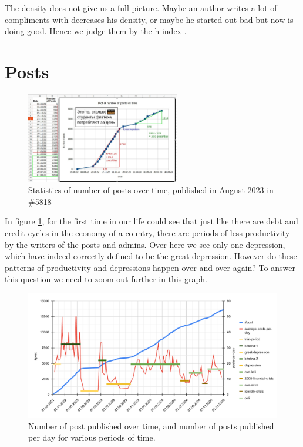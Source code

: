 \documentclass[
	12pt
] {article}
\begin{document}
	The density does not give us a full picture. Maybe an author writes a lot of compliments with decreases his density, or maybe he started out bad but now is doing good. Hence we judge them by the h-index \cite{wikipedia-hindex}.

\section{Posts}
	\begin{figure}[H]
		\centering
		\includegraphics[width=0.6\textwidth]{fig-old-count-post-time}
		\caption{Statistics of number of posts over time, published in August 2023 in \#5818 \cite{vk-link-old-stats}}
		\label{fig-old-count-post-time}
	\end{figure}
	In figure \ref{fig-old-count-post-time}, for the first time in our life could see that just like there are debt and credit cycles in the economy of a country, there are periods of less productivity by the writers of the posts and admins. Over here we see only one depression, which have indeed correctly defined to be the great depression. However do these patterns of productivity and depressions happen over and over again? To answer this question we need to zoom out further in this graph.

	\begin{figure}[H]
		\centering
		\includegraphics[width=1\textwidth]{fig-post-n-vs-time}
		\caption{Number of post published over time, and number of posts published per day for various periods of time.}
		\label{fig-post-n-vs-time}
	\end{figure}
	
\end{document}
